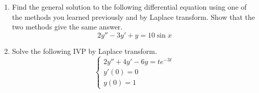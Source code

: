 \begin{enumerate}[label=\arabic*.]
\begin{enumerate}[label=(\alph*)]
		\end{enumerate}
	\item
		Find the general solution to the following differential equation using one of the methods you learned previously and by Laplace transform. Show that the two methods give the same answer.
		\begin{equation*}
			2y'' - 3y' + y = 10\sin{x}
		\end{equation*}
	\item
		Solve the following IVP by Laplace transform.
		\begin{equation*}
			\begin{cases}
				2y'' + 4y' - 6y = te^{-3t} \\
				y'(0) = 0 \\
				y(0) = 1
			\end{cases}
		\end{equation*}
\end{enumerate}